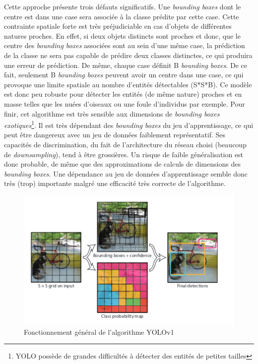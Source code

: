 \noindent Cette approche présente trois défauts significatifs. Une \textit{bounding boxes} dont le centre est dans une case sera associée à la classe prédite par cette case. Cette contrainte spatiale forte est très préjudiciable en cas d'objets de différentes natures proches. En effet, si deux objets distincts sont proches et donc, que le centre des \textit{bounding boxes} associées sont au sein d'une même case, la prédiction de la classe ne sera pas capable de prédire deux classes distinctes, ce qui produira une erreur de prédiction. De même, chaque case définit B \textit{bounding boxes}. De ce fait, seulement B \textit{bounding boxes} peuvent avoir un centre dans une case, ce qui provoque une limite spatiale au nombre d'entités détectables (S*S*B). Ce modèle est donc peu robuste pour détecter les entités (de même nature) proches et en masse telles que les nuées d'oiseaux ou une foule d'individus par exemple. Pour finir, cet algorithme est très sensible aux dimensions de \textit{bounding boxes} \textit{exotiques}\footnote{YOLO possède de grandes difficultés à détecter des entités de petites tailles}. Il est très dépendant des \textit{bounding boxes} du jeu d'apprentissage, ce qui peut être dangereux avec un jeu de données faiblement représentatif. Ses capacités de discrimination, du fait de l'architecture du réseau choisi (beaucoup de \textit{downsampling}), tend à être grossières. Un risque de faible généralisation est donc probable, de même que des approximations de calculs de dimensions des \textit{bounding boxes}. Une dépendance au jeu de données d'apprentissage semble donc très (trop) importante malgré une efficacité très correcte de l'algorithme.

\begin{figure}
\centering
\includegraphics[scale=0.4]{./tex/computer-vision/sota/yolov1.png}
\caption{Fonctionnement général de l'algorithme YOLOv1}
\label{yolov1}
\end{figure}

